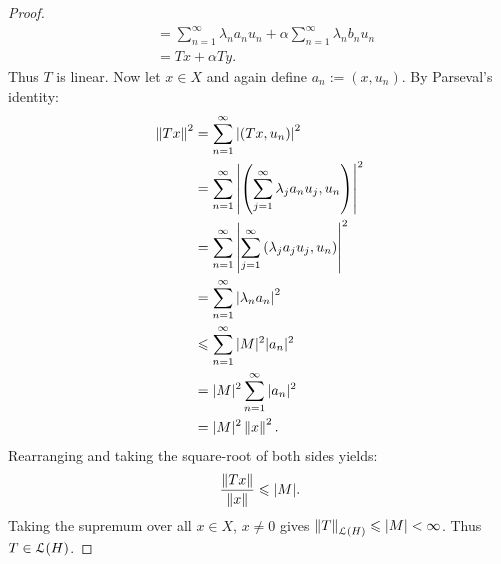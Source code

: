 \documentclass[10pt,oneside,openany]{memoir}
\begin{document}
\begin{proof}
\begin{equation*}
\begin{split}
            & = \sum_{n = 1}^\infty \lambda_n a_n u_n + \alpha \sum_{n = 1}^\infty \lambda_n b_n u _n \\
            & = Tx + \alpha Ty.
        \end{split}
        \end{equation*}
    Thus $T$ is linear. Now let $x \in X$ and again define $a_n := (x,u_n)$. By Parseval's identity:
        \begin{equation*}
        \begin{split}
            \left\lVert Tx \right\rVert^2 
            & = \sum_{n = 1}^\infty \left|  \left( Tx, u_n \right) \right|^2 \\
            & = \sum_{n = 1}^\infty \left|  \left( \sum_{j = 1}^\infty \lambda_j a_n u_j, u_n \right) \right|^2 \\
            & = \sum_{n = 1}^\infty \left| \sum_{j = 1}^\infty \left( \lambda_j a_j u_j , u_n \right) \right|^2 \\
            & = \sum_{n = 1}^\infty \left| \lambda_n a_n \right|^2 \\
            & \leqslant \sum_{n = 1}^\infty |M|^2 |a_n|^2 \\
            & = |M|^2 \sum_{n = 1}^\infty |a_n|^2 \\
            & = |M|^2 \left\lVert x \right\rVert^2.
        \end{split}
        \end{equation*}
    Rearranging and taking the square-root of both sides yields:
        \begin{equation*}
        \begin{split}
            \frac{\left\lVert Tx \right\rVert}{\left\lVert x \right\rVert} \leqslant |M|.
        \end{split}
        \end{equation*}
    Taking the supremum over all $x \in X$, $x \neq 0$ gives $\left\lVert T \right\rVert_{\mathcal{L}(H)} \leqslant |M| < \infty$. Thus $T \in \mathcal{L}(H)$.


\end{proof}
\end{document}
